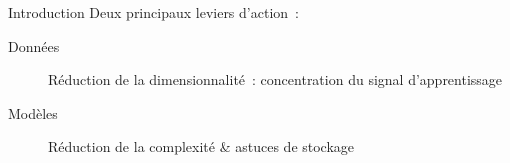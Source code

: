 \begin{frame}{Introduction}
  Deux principaux leviers d'action~:

  \begin{description}
    \item[Données] Réduction de la dimensionnalité~: concentration du signal d'apprentissage
    \item[Modèles] Réduction de la complexité \& astuces de stockage
  \end{description}
\end{frame}
